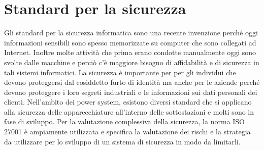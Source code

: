 \section{Standard per la sicurezza}
Gli standard per la sicurezza informatica sono una recente invenzione perché oggi informazioni sensibili sono spesso memorizzate su computer che sono collegati ad Internet. Inoltre molte attività che prima erano condotte manualmente oggi sono svolte dalle macchine e perciò c'è maggiore bisogno di affidabilità e di sicurezza in tali sistemi informatici. La sicurezza è importante per per gli individui che devono proteggersi dal cosiddetto furto di identità ma anche per le aziende perché devono proteggere i loro segreti industriali e le informazioni sui dati personali dei clienti. Nell'ambito dei power system, esistono diversi standard che si applicano alla sicurezza delle apparecchiature all'interno delle sottostazioni e molti sono in fase di sviluppo. Per la valutazione complessiva della sicurezza, la norma ISO 27001 è ampiamente utilizzata e specifica la valutazione dei rischi e la strategia da utilizzare per lo sviluppo di un sistema di sicurezza in modo da limitarli.
